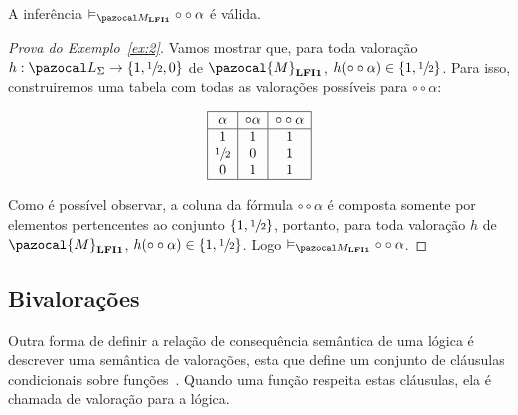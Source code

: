         \begin{exemplo}\label{ex:2}
            A inferência $ \conmat \circ \circ \alpha$ é válida.
        \end{exemplo}

        \begin{proof}[Prova do Exemplo~\ref{ex:2}]
            Vamos mostrar que, para toda valoração $h : \ling{} \to \{1,\meio{},0\}$ de $\pazocal{M}_{\lfium{}}$, $h(\circ \circ \alpha) \in \{1, \sfrac{1}{2}{}\}$. Para isso, construiremos uma tabela com todas as valorações possíveis para $\circ \circ \alpha$:
            \vspace*{-\baselineskip}
            \begin{center}
                \[
                    \begin{array}{|c|c|c|}%
                        \hline%
                        \alpha      & \circ \alpha & \circ \circ \alpha   \\
                        \hline%
                        1           & 1            &    1\\
                        \meio{    } & 0            &    1\\
                        0           & 1            &    1\\
                        \hline%
                    \end{array}
                \]
            \end{center}

            Como é possível observar, a coluna da fórmula $\circ \circ \alpha$ é composta somente por elementos pertencentes ao conjunto $\{1, \sfrac{1}{2}{}\}$, portanto, para toda valoração $h$ de $\pazocal{M}_{\lfium{}}$, $h(\circ \circ \alpha) \in \{1, \sfrac{1}{2}{}\}$. Logo $ \conmat \circ \circ \alpha$. \qedhere
            
        \end{proof}

        \subsection{Bivalorações}
        Outra forma de definir a relação de consequência semântica de uma lógica é descrever uma semântica de valorações, esta que define um conjunto de cláusulas condicionais sobre funções~\cite{DaCosta1977-NEWASA-3}. Quando uma função respeita estas cláusulas, ela é chamada de valoração para a lógica.

